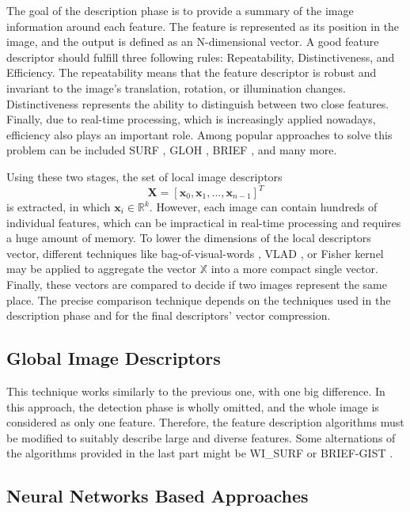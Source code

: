 The goal of the description phase is to provide a summary of the image information around each feature. The feature is represented as its position in the image, and the output is defined as an N-dimensional vector. A good feature descriptor should fulfill three following rules: Repeatability, Distinctiveness, and Efficiency. The repeatability means that the feature descriptor is robust and invariant to the image's translation, rotation, or illumination changes. Distinctiveness represents the ability to distinguish between two close features. Finally, due to real-time processing, which is increasingly applied nowadays, efficiency also plays an important role. Among popular approaches to solve this problem can be included SURF \parencite{SURF}, GLOH \parencite{GLOH}, BRIEF \parencite{BRIEF}, and many more.\par
Using these two stages, the set of local image descriptors
$$
    \mathbf{X} = [\mathbf{x}_0, \mathbf{x}_1, \dots, \mathbf{x}_{n-1}]^T
$$
is extracted, in which $\textbf{x}_i \in \mathbb{R}^k$. However, each image can contain hundreds of individual features, which can be impractical in real-time processing and requires a huge amount of memory. To lower the dimensions of the local descriptors vector, different techniques like bag-of-visual-words \parencite{BagOfVisualWords1}\parencite{BagOfVisualWords2}, VLAD \parencite{VLAD}, or Fisher kernel \parencite{FisherKernel} may be applied to aggregate the vector $\mathbb{X}$ into a more compact single vector. Finally, these vectors are compared to decide if two images represent the same place. The precise comparison technique depends on the techniques used in the description phase and for the final descriptors' vector compression.

\subsection{Global Image Descriptors}\label{section:globalImageDescriptors}

This technique works similarly to the previous one, with one big difference. In this approach, the detection phase is wholly omitted, and the whole image is considered as only one feature. Therefore, the feature description algorithms must be modified to suitably describe large and diverse features. Some alternations of the algorithms provided in the last part might be WI\_SURF \parencite{WiSurf} or BRIEF-GIST \parencite{BRIEFGIST}.

\subsection{Neural Networks Based Approaches}\label{section:neuralNetworksBasedApproaches}


